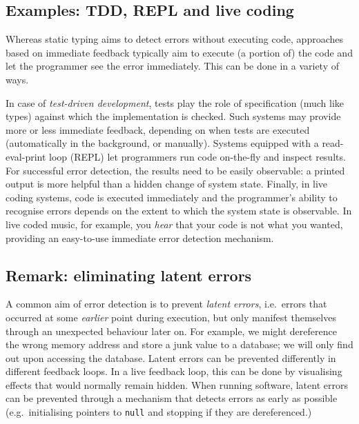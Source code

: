 \documentclass[ twoside,openright,titlepage,numbers=noenddot,headinclude,footinclude,cleardoublepage=empty,abstract=on,
                BCOR=5mm,paper=a4,fontsize=11pt
                ]{scrreprt}
\theoremstyle{definition}
\begin{document}
\hypertarget{examples-tdd-repl-and-live-coding}{\subsection{Examples: TDD, REPL and live
coding}\label{examples-tdd-repl-and-live-coding}}

Whereas static typing aims to detect errors without executing code,
approaches based on immediate feedback typically aim to execute (a
portion of) the code and let the programmer see the error immediately.
This can be done in a variety of ways.

In case of \emph{test-driven development}, tests play the role of
specification (much like types) against which the implementation is
checked. Such systems may provide more or less immediate feedback,
depending on when tests are executed (automatically in the background,
or manually). Systems equipped with a read-eval-print loop (REPL) let
programmers run code on-the-fly and inspect results. For successful
error detection, the results need to be easily observable: a printed
output is more helpful than a hidden change of system state. Finally, in
live coding systems, code is executed immediately and the programmer's
ability to recognise errors depends on the extent to which the system
state is observable. In live coded music, for example, you \emph{hear}
that your code is not what you wanted, providing an easy-to-use
immediate error detection mechanism.

\hypertarget{remark-eliminating-latent-errors}{\subsection{Remark: eliminating latent
errors}\label{remark-eliminating-latent-errors}}

A common aim of error detection is to prevent \emph{latent errors},
i.e.~errors that occurred at some \emph{earlier} point during execution,
but only manifest themselves through an unexpected behaviour later on.
For example, we might dereference the wrong memory address and store a
junk value to a database; we will only find out upon accessing the
database. Latent errors can be prevented differently in different
feedback loops. In a live feedback loop, this can be done by visualising
effects that would normally remain hidden. When running software, latent
errors can be prevented through a mechanism that detects errors as early
as possible (e.g.~initialising pointers to \texttt{null} and stopping if
they are dereferenced.)
\end{document}
